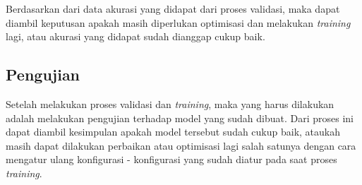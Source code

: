 Berdasarkan dari data akurasi yang didapat dari proses validasi, maka dapat diambil keputusan apakah masih diperlukan optimisasi dan melakukan \textit{training} lagi, atau akurasi yang didapat sudah dianggap cukup baik.

\subsection{Pengujian}

Setelah melakukan proses validasi dan \textit{training}, maka yang harus dilakukan adalah melakukan pengujian terhadap model yang sudah dibuat. Dari proses ini dapat diambil kesimpulan apakah model tersebut sudah cukup baik, ataukah masih dapat dilakukan perbaikan atau optimisasi lagi salah satunya dengan cara mengatur ulang konfigurasi - konfigurasi yang sudah diatur pada saat proses \textit{training}.
